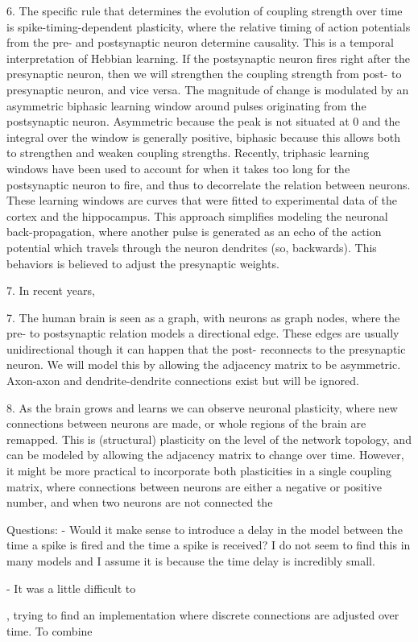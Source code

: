 6. The specific rule that determines the evolution of coupling strength over time is spike-timing-dependent plasticity, where the relative timing of action potentials from the pre- and postsynaptic neuron determine causality. This is a temporal interpretation of Hebbian learning. If the postsynaptic neuron fires right after the presynaptic neuron, then we will strengthen the coupling strength from post- to presynaptic neuron, and vice versa. The magnitude of change is modulated by an asymmetric biphasic learning window around pulses originating from the postsynaptic neuron. Asymmetric because the peak is not situated at 0 and the integral over the window is generally positive, biphasic because this allows both to strengthen and weaken coupling strengths. Recently, triphasic learning windows have been used to account for when it takes too long for the postsynaptic neuron to fire, and thus to decorrelate the relation between neurons. These learning windows are curves that were fitted to experimental data of the cortex and the hippocampus.
This approach simplifies modeling the neuronal back-propagation, where another pulse is generated as an echo of the action potential which travels through the neuron dendrites (so, backwards). This behaviors is believed to adjust the presynaptic weights.

7. In recent years, 

7. The human brain is seen as a graph, with neurons as graph nodes, where the pre- to postsynaptic relation models a directional edge. These edges are usually unidirectional though it can happen that the post- reconnects to the presynaptic neuron. We will model this by allowing the adjacency matrix to be asymmetric. Axon-axon and dendrite-dendrite connections exist but will be ignored.

8. As the brain grows and learns we can observe neuronal plasticity, where new connections between neurons are made, or whole regions of the brain are remapped. This is (structural) plasticity on the level of the network topology, and can be modeled by allowing the adjacency matrix to change over time.
However, it might be more practical to incorporate both plasticities in a single coupling matrix, where connections between neurons are either a negative or positive number, and when two neurons are not connected the

Questions:
- Would it make sense to introduce a delay in the model between the time a spike is fired and the time a spike is received? I do not seem to find this in many models and I assume it is because the time delay is incredibly small.

- It was a little difficult to 


, trying to find an implementation where discrete connections are adjusted over time. To combine 


